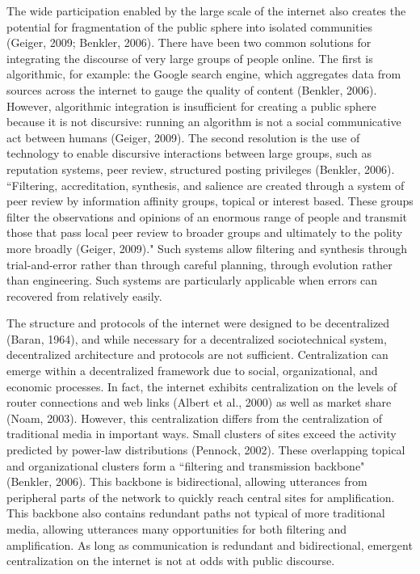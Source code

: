 The wide participation enabled by the large scale of the internet also creates the potential for fragmentation of the public sphere into isolated communities (Geiger, 2009; Benkler, 2006). There have been two common solutions for integrating the discourse of very large groups of people online. The first is algorithmic, for example: the Google search engine, which aggregates data from sources across the internet to gauge the quality of content (Benkler, 2006). However, algorithmic integration is insufficient for creating a public sphere because it is not discursive: running an algorithm is not a social communicative act between humans (Geiger, 2009). The second resolution is the use of technology to enable discursive interactions between large groups, such as reputation systems, peer review, structured posting privileges (Benkler, 2006). ``Filtering, accreditation, synthesis, and salience are created through a system of peer review by information affinity groups, topical or interest based. These groups filter the observations and opinions of an enormous range of people and transmit those that pass local peer review to broader groups and ultimately to the polity more broadly (Geiger, 2009)." Such systems allow filtering and synthesis through trial-and-error rather than through careful planning, through evolution rather than engineering. Such systems are particularly applicable when errors can recovered from relatively easily.

The structure and protocols of the internet were designed to be decentralized (Baran, 1964), and while necessary for a decentralized sociotechnical system, decentralized architecture and protocols are not sufficient. Centralization can emerge within a decentralized framework due to social, organizational, and economic processes. In fact, the internet exhibits centralization on the levels of router connections and web links (Albert et al., 2000) as well as market share (Noam, 2003). However, this centralization differs from the centralization of traditional media in important ways. Small clusters of sites exceed the activity predicted by power-law distributions (Pennock, 2002). These overlapping topical and organizational clusters form a ``filtering and transmission backbone" (Benkler, 2006). This backbone is bidirectional, allowing utterances from peripheral parts of the network to quickly reach central sites for amplification. This backbone also contains redundant paths not typical of more traditional media, allowing utterances many opportunities for both filtering and amplification. As long as communication is redundant and bidirectional, emergent centralization on the internet is not at odds with public discourse.

